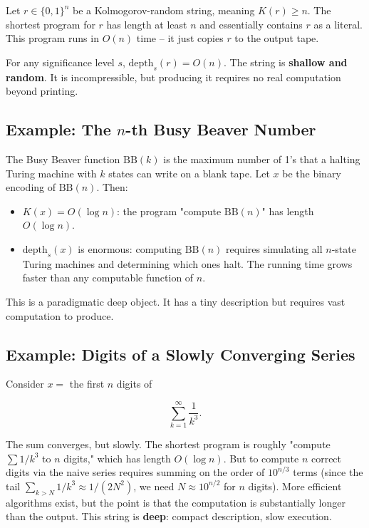 Let $r \in \{ 0,1\} ^n$ be a Kolmogorov-random string, meaning $K(r) \geq n$. The shortest program for $r$ has length at least $n$ and essentially contains $r$ as a literal. This program runs in $O(n)$ time -- it just copies $r$ to the output tape.

For any significance level $s$, $\text{depth}_s(r) = O(n)$. The string is \textbf{shallow and random}. It is incompressible, but producing it requires no real computation beyond printing.

\subsection*{Example: The $n$-th Busy Beaver Number}

The Busy Beaver function $\text{BB}(k)$ is the maximum number of 1's that a halting Turing machine with $k$ states can write on a blank tape. Let $x$ be the binary encoding of $\text{BB}(n)$. Then:

\begin{itemize}
\item $K(x) = O(\log n)$: the program "compute $\text{BB}(n)$" has length $O(\log n)$.
\item $\text{depth}_s(x)$ is enormous: computing $\text{BB}(n)$ requires simulating all $n$-state Turing machines and determining which ones halt. The running time grows faster than any computable function of $n$.
\end{itemize}

This is a paradigmatic deep object. It has a tiny description but requires vast computation to produce.

\subsection*{Example: Digits of a Slowly Converging Series}

Consider $x = $ the first $n$ digits of

\[\sum_{k=1}^{\infty} \frac{1}{k^3}.\]

The sum converges, but slowly. The shortest program is roughly "compute $\sum 1/k^3$ to $n$ digits," which has length $O(\log n)$. But to compute $n$ correct digits via the naive series requires summing on the order of $10^{n/3}$ terms (since the tail $\sum_{k>N} 1/k^3 \approx 1/(2N^2)$, we need $N \approx 10^{n/2}$ for $n$ digits). More efficient algorithms exist, but the point is that the computation is substantially longer than the output. This string is \textbf{deep}: compact description, slow execution.

